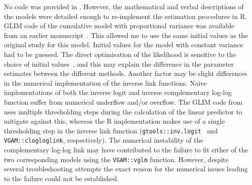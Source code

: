 No code was provided in \citep{candy1991modeling}. 
However, the mathematical and verbal descriptions of the models were detailed enough to re-implement the estimation procedures in R. 
GLIM code of the cumulative model with proportional variance was available from an earlier manuscript~\citep{candy1990biology}. 
This allowed me to use the same initial values as the original study for this model. 
Initial values for the model with constant variance had to be guessed.
The direct optimisation of the likelihood is sensitive to the choice of initial values~\citep{dennis1986stochastic}, and this may explain the difference in the parameter estimates between the different methods. 
Another factor may be slight differences in the numerical implementation of the inverse link functions. 
Naive implementations of both the inverse logit and inverse complementary log-log function suffer from numerical underflow and/or overflow. 
The GLIM code from \citep{candy1990biology} uses multiple thresholding steps during the calculation of the linear predictor to mitigate against this, whereas the R implementation makes use of a single thresholding step in the inverse link function (\verb+gtools::inv.logit+~\citep{gtools} and \verb+VGAM::clogloglink+, respectively).  
The numerical instability of the complementary log-log link may have contributed to the failure to fit either of the two corresponding models using the \verb+VGAM::vglm+ function. 
However, despite several troubleshooting attempts the exact reason for the numerical issues leading to the failure could not be established.

\afterpage{\clearpage}
